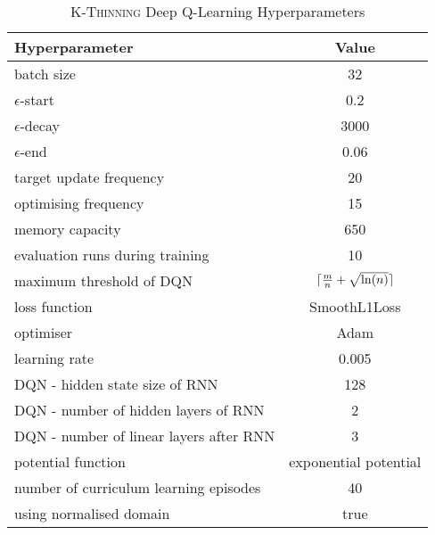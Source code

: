 \begin{table}[h!]\label{tab:k-thinning-hyperparameters}
\begin{threeparttable}
\caption{\textsc{K-Thinning} Deep Q-Learning Hyperparameters}
\centering
\begin{tabular}{l|c}
\toprule
Hyperparameter             &     Value \\
\midrule
batch size               &     32 \\ 
$\epsilon$-start               &    0.2 \\ 
$\epsilon$-decay         &     3000\\
$\epsilon$-end              &     0.06 \\
target update frequency               &     20 \\ 
optimising frequency          &     15 \\ 
memory capacity     &     650 \\
evaluation runs during training             &     10 \\
maximum threshold of DQN             &     $\lceil\frac{m}{n}+\sqrt{\ln(n)}\rceil$ \\ 
loss function               &     SmoothL1Loss \\ 
optimiser        &     Adam \\
learning rate             &     0.005 \\
DQN - hidden state size of RNN               &     128 \\ 
DQN - number of hidden layers of RNN         &     2 \\ 
DQN - number of linear layers after RNN     &     3 \\
potential function            &    exponential potential \\
number of curriculum learning episodes            & 40 \\ 
using normalised domain               &     true \\ 
\bottomrule
\end{tabular}
\end{threeparttable}
\end{table}




